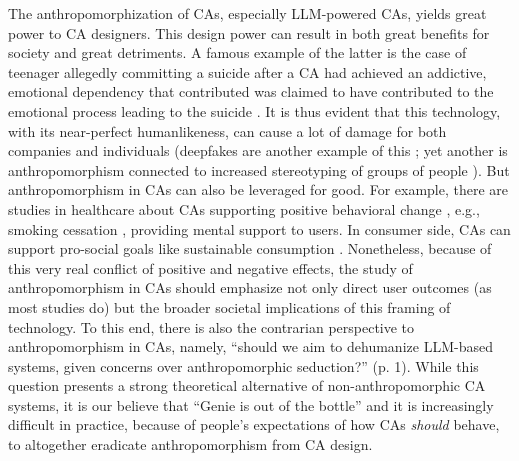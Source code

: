 \documentclass[manuscript,anonymous,sigconf]{acmart}
\begin{document}
The anthropomorphization of CAs, especially LLM-powered CAs, yields great power to CA designers. This design power can result in both great benefits for society and great detriments. A famous example of the latter is the case of teenager allegedly committing a suicide after a CA had achieved an addictive, emotional dependency that contributed was claimed to have contributed to the emotional process leading to the suicide \citep{laura_kuenssberg_mothers_2025}. It is thus evident that this technology, with its near-perfect humanlikeness, can cause a lot of damage for both companies and individuals (deepfakes are another example of this \citep{mustak_deepfakes_2023}; yet another is anthropomorphism connected to increased stereotyping of groups of people \citep{chaves2021should}). But anthropomorphism in CAs can also be leveraged for good. For example, there are studies in healthcare about CAs supporting positive behavioral change \citep{montenegro_survey_2019}, e.g., smoking cessation \citep{whittaker_chatbots_2022}, providing mental support to users. In consumer side, CAs can support pro-social goals like sustainable consumption \citep{manzo_artificial_2025}. Nonetheless, because of this very real conflict of positive and negative effects, the study of anthropomorphism in CAs should emphasize not only direct user outcomes (as most studies do) but the broader societal implications of this framing of technology. To this end, there is also the contrarian perspective to anthropomorphism in CAs, namely, ``should we aim to dehumanize LLM-based systems, given concerns over anthropomorphic seduction?'' \citep{peter_benefits_2025} (p. 1). While this question presents a strong theoretical alternative of non-anthropomorphic CA systems, it is our believe that ``Genie is out of the bottle'' and it is increasingly difficult in practice, because of people's expectations of how CAs \textit{should} behave, to altogether eradicate anthropomorphism from CA design.
\end{document}
